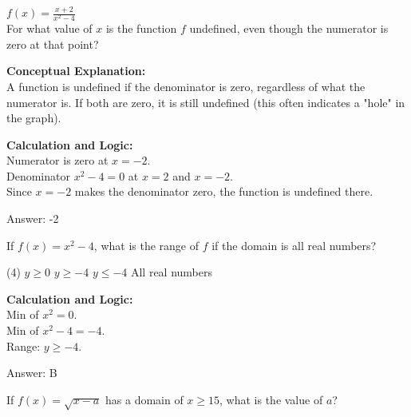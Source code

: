 \documentclass[11pt,paper=a4,answers]{exam}
\begin{document}
\begin{questions}
\vspace{40pt}

\question
$f(x) = \frac{x+2}{x^2-4}$ \\
For what value of $x$ is the function $f$ undefined, even though the numerator is zero at that point?

\begin{solution}
\textbf{Conceptual Explanation:} \\
A function is undefined if the denominator is zero, regardless of what the numerator is. If both are zero, it is still undefined (this often indicates a "hole" in the graph).

\vspace{30pt}

\textbf{Calculation and Logic:} \\
Numerator is zero at $x = -2$. \\
Denominator $x^2 - 4 = 0$ at $x = 2$ and $x = -2$. \\
Since $x = -2$ makes the denominator zero, the function is undefined there.

\vspace{30pt}

Answer: \colorbox{yellow!100}{-2}
\end{solution}

\vspace{40pt}

\question
If $f(x) = x^2 - 4$, what is the range of $f$ if the domain is all real numbers?
\begin{tasks}(4)
    \task $y \geq 0$
    \task $y \geq -4$
    \task $y \leq -4$
    \task All real numbers
\end{tasks}

\begin{solution}
\textbf{Calculation and Logic:} \\
Min of $x^2 = 0$. \\
Min of $x^2 - 4 = -4$. \\
Range: $y \geq -4$.

\vspace{30pt}

Answer: \colorbox{yellow!100}{B}
\end{solution}

\vspace{40pt}

\question
If $f(x) = \sqrt{x-a}$ has a domain of $x \geq 15$, what is the value of $a$?


\end{questions}
\end{document}
